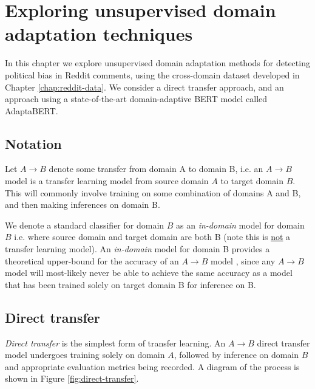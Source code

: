 \chapter{Exploring unsupervised domain adaptation techniques} \label{chap:domain-adaptation}

In this chapter we explore unsupervised domain adaptation methods for detecting political bias in Reddit comments, using the cross-domain dataset developed in Chapter \ref{chap:reddit-data}. We consider a direct transfer approach, and an approach using a state-of-the-art domain-adaptive BERT model called AdaptaBERT.

\section{Notation}

Let $ A \rightarrow B $ denote some transfer from domain A to domain B, i.e. an $ A \rightarrow B $ model is a transfer learning model from source domain $ A $ to target domain $ B $. This will commonly involve training on some combination of domains A and B, and then making inferences on domain B.

We denote a standard classifier for domain $ B $ as an \textit{in-domain} model for domain $ B $ i.e. where source domain and target domain are both B (note this is \underline{not} a transfer learning model). An \textit{in-domain} model for domain B provides a theoretical upper-bound for the accuracy of an $ A \rightarrow B $ model \cite{adaptabert}, since any $ A \rightarrow B $ model will most-likely never be able to achieve the same accuracy as a model that has been trained solely on target domain B for inference on B.

\section{Direct transfer} \label{sec:direct-transfer}

\textit{Direct transfer} is the simplest form of transfer learning. An $ A \rightarrow B $ direct transfer model undergoes training solely on domain $ A $, followed by inference on domain $ B $ and appropriate evaluation metrics being recorded. A diagram of the process is shown in Figure \ref{fig:direct-transfer}.

